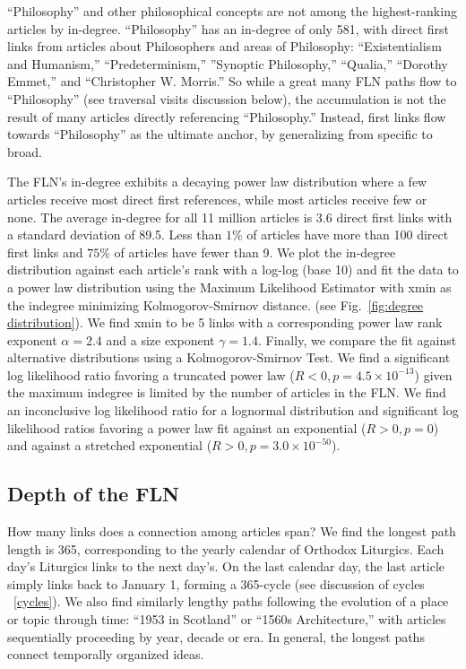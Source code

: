 \documentclass[pre,twocolumn,twoside,superscriptaddress,floatfix, aps, 10pt]{revtex4-1}
\begin{document}
``Philosophy'' and other philosophical concepts
are not among the highest-ranking articles by in-degree.
``Philosophy'' has an in-degree of only 581, with direct first links from articles about Philosophers and areas of Philosophy: ``Existentialism and Humanism,'' ``Predeterminism,'' ''Synoptic Philosophy,'' ``Qualia,'' ``Dorothy Emmet,'' and ``Christopher W. Morris.''
So while a great many FLN paths flow to 
``Philosophy'' (see traversal visits discussion below), 
the accumulation is not the 
result of many articles directly referencing ``Philosophy.'' 
Instead, first links flow towards ``Philosophy'' as the 
ultimate anchor, by generalizing from specific to broad.


The FLN's in-degree exhibits a decaying power law distribution where a few articles 
receive most direct first references, while most articles receive few or none.
The average in-degree for all 11 million articles is 3.6 direct first links with a standard deviation of 89.5.
Less than $1\%$ of articles have more than 100 direct first links and $75\%$ of articles
have fewer than 9. 
We plot the in-degree distribution against each article's rank with a log-log (base 10) and fit the data to a power law 
distribution using the Maximum Likelihood Estimator with xmin as the indegree minimizing Kolmogorov-Smirnov distance.
(see Fig.~\ref{fig:degree distribution}).
We find xmin to be 5 links with a corresponding power law rank exponent $\alpha = 2.4$ and a size exponent $\gamma = 1.4$. 
Finally, we compare the fit against alternative distributions using a Kolmogorov-Smirnov Test. We find a significant log likelihood ratio favoring a  truncated power law ($R < 0, p=4.5\times10^{-13}$) given the maximum indegree is limited by the number of articles in the FLN. We find an inconclusive log likelihood ratio for a lognormal distribution and significant log likelihood ratios favoring a power law fit against an exponential ($R  > 0, p=0$) and against a stretched exponential ($R > 0, p = 3.0\times10^{-50}$). 


\subsection{Depth of the FLN}

How many links does a connection among articles span? 
We find the longest path length is 365,
corresponding to the yearly calendar of Orthodox Liturgics.
Each day's Liturgics links to the next day's. On the last calendar day, the last article simply links back to January 1, forming a 365-cycle 
(see discussion of cycles ~\ref{cycles}).
We also find similarly lengthy paths following the evolution of a place or topic through time: 
``1953 in Scotland'' or ``1560s Architecture,'' with articles sequentially proceeding by year, decade or era.
In general, the longest paths connect temporally organized ideas.
\end{document}
